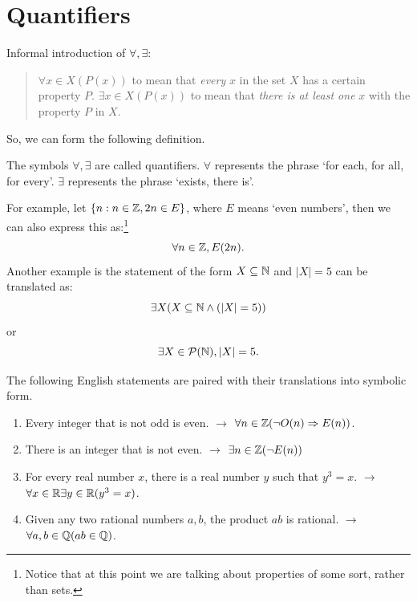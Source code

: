 \section{Quantifiers} 
Informal introduction of $\forall, \exists$:
\begin{quote}
    $\forall x\in X(P(x))$ to mean that \emph{every} $x$ in the set $X$ has a certain property $P$.\newline
    $\exists x\in X(P(x))$ to mean that \emph{there is at least one} $x$ with the property $P$ in $X$. 
\end{quote}
So, we can form the following definition. 
\begin{defn}
    The symbols $\forall, \exists$ are called quantifiers.\newline
    $\forall$ represents the phrase `for each, for all, for every'.\newline
    $\exists$ represents the phrase `exists, there is'.
\end{defn}

For example, let $\{n: n\in\mathbb{Z}, 2n\in E\}$, where $E$ means `even numbers', then we can also express this as:\footnote{Notice that at this point we are talking about properties of some sort, rather than sets.} 
$$
\forall n\in\mathbb{Z},E(2n).
$$
Another example is the statement of the form $X\subseteq\mathbb{N}$ and $\lvert X \rvert=5$ can be translated as: 
$$
\exists X(X\subseteq\mathbb{N}\land(\lvert X \rvert=5))
$$
or 
$$
\exists X\in\mathcal{P}(\mathbb{N}),\lvert X \rvert=5.
$$

\begin{example}
    The following English statements are paired with their translations into symbolic form. 
    \begin{enumerate}
        \item Every integer that is not odd is even. $\rightarrow$ $\forall n\in\mathbb{Z}(\neg O(n)\Rightarrow E(n))$.
        \item There is an integer that is not even. $\rightarrow$ $\exists n\in\mathbb{Z}(\neg E(n))$
        \item For every real number $x$, there is a real number $y$ such that $y^{3}=x$. $\rightarrow$ $\forall x\in\mathbb{R}\exists y\in \mathbb{R}(y^{3}=x)$.
        \item Given any two rational numbers $a,b$, the product $ab$ is rational. $\rightarrow$ $\forall a,b\in\mathbb{Q}(ab\in\mathbb{Q})$.
    \end{enumerate}
\end{example}

